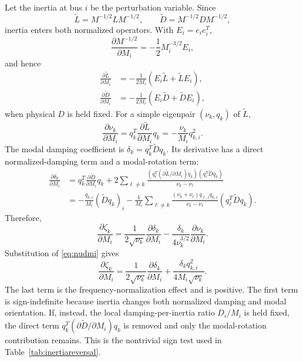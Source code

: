 \documentclass[journal]{IEEEtran}
\newcommand{\Lt}{\widetilde L}
\newcommand{\Dt}{\widetilde D}
\begin{document}
Let the inertia at bus $i$ be the perturbation variable. Since
\begin{equation}
\Lt=M^{-1/2}LM^{-1/2},\qquad \Dt=M^{-1/2}DM^{-1/2},
\end{equation}
inertia enters both normalized operators. With $E_i=e_ie_i^T$,
\begin{equation}
\frac{\partial M^{-1/2}}{\partial M_i}
=-\frac{1}{2}M_i^{-3/2}E_i,
\end{equation}
and hence
\begin{align}
\frac{\partial\Lt}{\partial M_i}
&=-\frac{1}{2M_i}(E_i\Lt+\Lt E_i),\\
\frac{\partial\Dt}{\partial M_i}
&=-\frac{1}{2M_i}(E_i\Dt+\Dt E_i),
\label{eq:dtdmi}
\end{align}
when physical $D$ is held fixed. For a simple eigenpair $(\nu_k,q_k)$ of $\Lt$,
\begin{equation}
\frac{\partial\nu_k}{\partial M_i}
=q_k^T\frac{\partial\Lt}{\partial M_i}q_k
=-\frac{\nu_k}{M_i}q_{k,i}^2.
\label{eq:nudmi}
\end{equation}
The modal damping coefficient is $\delta_k=q_k^T\Dt q_k$. Its derivative has a direct normalized-damping term and a modal-rotation term:
\begin{align}
\frac{\partial\delta_k}{\partial M_i}
&=q_k^T\frac{\partial\Dt}{\partial M_i}q_k
+2\sum_{\ell\neq k}
\frac{
\left(q_\ell^T(\partial\Lt/\partial M_i)q_k\right)
\left(q_\ell^T\Dt q_k\right)}
{\nu_k-\nu_\ell} \nonumber\\
&=-\frac{q_{k,i}}{M_i}(\Dt q_k)_i
-\frac{1}{M_i}
\sum_{\ell\neq k}
\frac{(\nu_k+\nu_\ell)q_{\ell,i}q_{k,i}}
{\nu_k-\nu_\ell}
\left(q_\ell^T\Dt q_k\right).
\label{eq:deltadmi}
\end{align}
Therefore,
\begin{equation}
\frac{\partial\zeta_k}{\partial M_i}
=\frac{1}{2\sqrt{\nu_k}}\frac{\partial\delta_k}{\partial M_i}
-\frac{\delta_k}{4\nu_k^{3/2}}\frac{\partial\nu_k}{\partial M_i}.
\label{eq:zetadmi_general}
\end{equation}
Substitution of \eqref{eq:nudmi} gives
\begin{equation}
\frac{\partial\zeta_k}{\partial M_i}
=\frac{1}{2\sqrt{\nu_k}}\frac{\partial\delta_k}{\partial M_i}
+\frac{\delta_kq_{k,i}^2}{4M_i\sqrt{\nu_k}}.
\end{equation}
The last term is the frequency-normalization effect and is positive. The first term is sign-indefinite because inertia changes both normalized damping and modal orientation. If, instead, the local damping-per-inertia ratio $D_i/M_i$ is held fixed, the direct term $q_k^T(\partial\Dt/\partial M_i)q_k$ is removed and only the modal-rotation contribution remains. This is the nontrivial sign test used in Table~\ref{tab:inertiareversal}.
\end{document}
